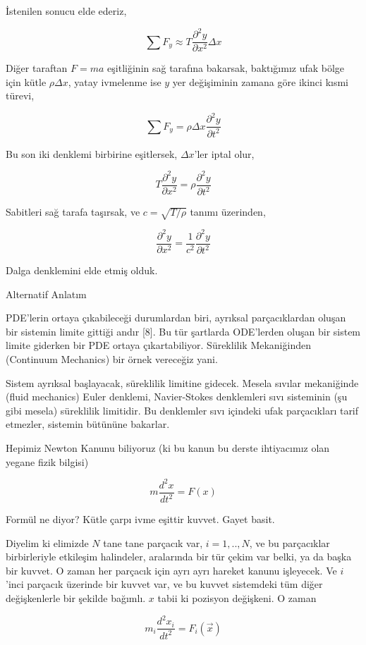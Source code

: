 \documentclass[12pt,fleqn]{article}\usepackage{../../common}
\begin{document}
İstenilen sonucu elde ederiz, 

$$
\sum F_y \approx T \frac{\partial^2 y}{\partial x^2} \Delta x
$$

Diğer taraftan $F=ma$ eşitliğinin sağ tarafına bakarsak, baktığımız ufak bölge
için kütle $\rho\Delta x$, yatay ivmelenme ise $y$ yer değişiminin zamana göre
ikinci kısmi türevi,

$$
\sum F_y = \rho \Delta x \frac{\partial^2 y}{\partial t^2}
$$

Bu son iki denklemi birbirine eşitlersek, $\Delta x$'ler iptal olur, 

$$
T \frac{\partial^2 y}{\partial x^2}  =
\rho \frac{\partial^2 y}{\partial t^2}
$$

Sabitleri sağ tarafa taşırsak, ve $c = \sqrt{T / \rho}$ tanımı üzerinden,

$$
\frac{\partial^2 y}{\partial x^2}  =
\frac{1}{c^2}\frac{\partial^2 y}{\partial t^2}
$$

Dalga denklemini elde etmiş olduk.

Alternatif Anlatım

PDE'lerin ortaya çıkabileceği durumlardan biri, ayrıksal parçacıklardan oluşan
bir sistemin limite gittiği andır [8]. Bu tür şartlarda ODE'lerden oluşan bir
sistem limite giderken bir PDE ortaya çıkartabiliyor. Süreklilik Mekaniğinden
(Continuum Mechanics) bir örnek vereceğiz yani.

Sistem ayrıksal başlayacak, süreklilik limitine gidecek. Mesela sıvılar
mekaniğinde (fluid mechanics) Euler denklemi, Navier-Stokes denklemleri sıvı
sisteminin (şu gibi mesela) süreklilik limitidir. Bu denklemler sıvı içindeki
ufak parçacıkları tarif etmezler, sistemin bütününe bakarlar.

Hepimiz Newton Kanunu biliyoruz (ki bu kanun bu derste ihtiyacımız olan
yegane fizik bilgisi)

$$ m \frac{d^2x}{dt^2} = F(x) $$

Formül ne diyor? Kütle çarpı ivme eşittir kuvvet. Gayet basit.

Diyelim ki elimizde $N$ tane tane parçacık var, $i=1,..,N$, ve bu
parçacıklar birbirleriyle etkileşim halindeler, aralarında bir tür çekim
var belki, ya da başka bir kuvvet. O zaman her parçacık için ayrı ayrı
hareket kanunu işleyecek. Ve $i$'inci parçacık üzerinde bir kuvvet var, ve
bu kuvvet sistemdeki tüm diğer değişkenlerle bir şekilde bağımlı. $x$ tabii
ki pozisyon değişkeni. O zaman

$$ m_i \frac{d^2x_i}{dt^2} = F_i(\vec{x}) $$
\end{document}
